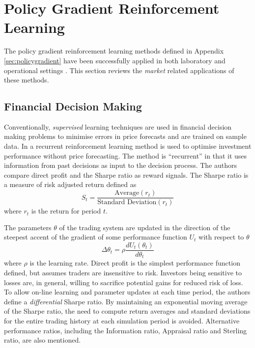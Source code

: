 \section{Policy Gradient Reinforcement Learning}
The policy gradient reinforcement learning methods defined in Appendix
\ref{sec:policygradient} have been successfully applied in both laboratory and
operational settings \cite{barto:policy,shaal:robots,peshkin:routing}.  This
section reviews the \textit{market} related applications of these methods.

\subsection{Financial Decision Making}
Conventionally, \textit{supervised} learning techniques are used in financial
decision making problems to minimise errors in price forecasts and are trained
on sample data.  In  a recurrent reinforcement learning
method is used to optimise investment performance without price forecasting.
The method is ``recurrent'' in that it uses information from past decisions as
input to the decision process.  The authors compare direct profit and the
Sharpe ratio \cite{sharpe:ratio66,sharpe:ratio94} as reward signals. The Sharpe ratio is a
measure of risk adjusted return defined as
\begin{equation}
S_t = \frac{\mbox{Average}(r_t)}{\mbox{Standard Deviation}(r_t)}
\end{equation}
where $r_t$ is the return for period $t$.

The parameters $\theta$ of the trading system are updated in the direction of
the steepest accent of the gradient of some performance function $U_t$ with
respect to $\theta$
\begin{equation}
\Delta\theta_t = \rho \frac{dU_t(\theta_t)}{d\theta_t}
\end{equation}
where $\rho$ is the learning rate.  Direct profit is the simplest performance
function defined, but assumes traders are insensitive to risk.  Investors
being sensitive to losses are, in general, willing to sacrifice potential gains
for reduced risk of loss. To allow on-line learning and parameter updates at
each time period, the authors define a \textit{differential} Sharpe ratio.  By maintaining an
exponential moving average of the Sharpe ratio, the need to compute return
averages and standard deviations for the entire trading history at each
simulation period is avoided.  Alternative performance ratios, including the
Information ratio, Appraisal ratio and Sterling ratio, are also mentioned.

